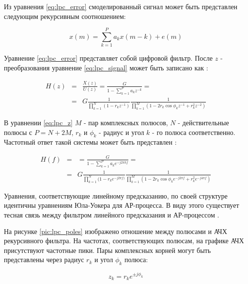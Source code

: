Из уравнения \ref{eq:lpc_error} смоделированный сигнал может быть представлен следующим рекурсивным соотношением:
\begin{center}
\begin{equation}
	\label{eq:lpc_signal}
	x(m) = \sum \limits_{k=1}^P a_k x(m-k) + e(m)
\end{equation}
\end{center}

Уравнение \ref{eq:lpc_error} представляет собой цифровой фильтр.
После ${z}$ - преобразования уравнение \ref{eq:lpc_signal} может быть записано как \cite{saeed_book}:
\begin{center}
\begin{eqnarray}
	\label{eq:lpc_z}
		H(z)	& = & \frac{X(z)}{U(z)} = \frac{G}{1 - \sum \limits_{k=1}^P a_kz^{-k}} =  \nonumber \\
			& = & G\frac{1}{\prod \limits_{k=1}^N (1-r_kz^{-1})} \frac{1}{\prod \limits_{k=1}^M (1-2r_k \cos \phi_k z^{-1} + r_k^2z^{-2})}
\end{eqnarray}
\end{center}

В уравнении \ref{eq:lpc_z} ${M}$ - пар комплексных полюсов, ${N}$ - действительные полюсы с ${P=N+2M}$,
${r_k}$ и ${\phi_k}$ - радиус и угол ${k}$ - го полюса соответственно. Частотный ответ такой системы 
может быть представлен \cite{saeed_book}:
\begin{center}
\begin{eqnarray}
	\label{eq:lpc_freq_resp}
		H(f)	& = & = \frac{G}{1 - \sum \limits_{k=1}^P a_k e^{-j2 \pi kf}} =  \nonumber \\
			& = & G\frac{1}{\prod \limits_{k=1}^N (1-r_k e^{-j2 \pi f)}} \frac{1}{\prod \limits_{k=1}^M (1-2r_k \cos \phi_k e^{-j2 \pi f} + r_k^2 e^{-j4 \pi f})}
\end{eqnarray}
\end{center}

Уравнения, соответствующие линейному предсказанию, по своей структуре идентичны уравнениям Юла-Уокера для АР-процесса.
В виду этого существует тесная связь между фильтром линейного предсказания и АР-процессом \cite{marpl_book}.

На рисунке \ref{pic:lpc_poles} изображено отношение между полюсами и АЧХ рекурсивного фильтра. На частотах, соответствующих полюсам,
на графике АЧХ присутствуют частотные пики. Пары комплексных корней могут быть представлены через радиус ${r_k}$ и угол ${\phi_k}$
полюса:
\begin{center}
\begin{equation}
	\label{eq:lpc_poles}
	z_k = r_k e^{\pm j \phi_k}
\end{equation}
\end{center}

